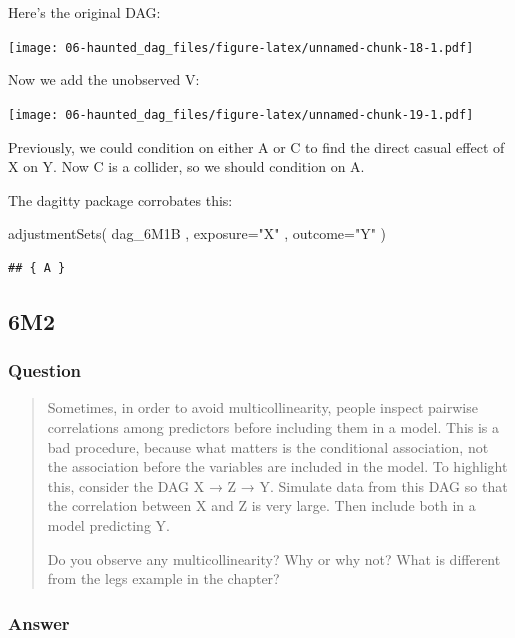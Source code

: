 \documentclass[
]{book}
\newenvironment{Shaded}{\begin{snugshade}}{\end{snugshade}}
\newcommand{\AttributeTok}[1]{\textcolor[rgb]{0.77,0.63,0.00}{#1}}
\newcommand{\FunctionTok}[1]{\textcolor[rgb]{0.00,0.00,0.00}{#1}}
\newcommand{\NormalTok}[1]{#1}
\newcommand{\StringTok}[1]{\textcolor[rgb]{0.31,0.60,0.02}{#1}}
\begin{document}
Here's the original DAG:

\texttt{[image: 06-haunted\_dag\_files/figure-latex/unnamed-chunk-18-1.pdf]}

Now we add the unobserved V:

\texttt{[image: 06-haunted\_dag\_files/figure-latex/unnamed-chunk-19-1.pdf]}

Previously, we could condition on either A or C to find the direct casual effect of X on Y. Now C is a collider, so we should condition on A.

The dagitty package corrobates this:

\begin{Shaded}
\begin{Highlighting}[]
\FunctionTok{adjustmentSets}\NormalTok{( dag\_6M1B , }\AttributeTok{exposure=}\StringTok{"X"}\NormalTok{ , }\AttributeTok{outcome=}\StringTok{"Y"}\NormalTok{ )}
\end{Highlighting}
\end{Shaded}

\begin{verbatim}
## { A }
\end{verbatim}

\hypertarget{m2-3}{%
\subsection*{6M2}\label{m2-3}}

\hypertarget{question-53}{%
\subsubsection*{Question}\label{question-53}}

\begin{quote}
Sometimes, in order to avoid multicollinearity, people inspect pairwise correlations among predictors before including them in a model. This is a bad procedure, because what matters is the conditional association, not the association before the variables are included in the model. To highlight this, consider the DAG X → Z → Y. Simulate data from this DAG so that the correlation between X and Z is very large. Then include both in a model predicting Y.

Do you observe any multicollinearity? Why or why not? What is different from the legs example in the chapter?
\end{quote}

\hypertarget{answer-53}{%
\subsubsection*{Answer}\label{answer-53}}
\end{document}
